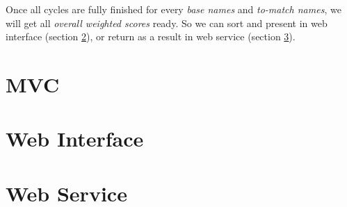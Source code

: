 Once all cycles are fully finished for every \emph{base names} and
\emph{to-match names}, we will get all \emph{overall weighted scores}
ready. So we can sort and present in web interface (section \ref{sec:wi}), or return
as a result in web service (section \ref{sec:ws}).

\section{MVC}
\label{sec:mcv}

\section{Web Interface}
\label{sec:wi}

\section{Web Service}
\label{sec:ws}
